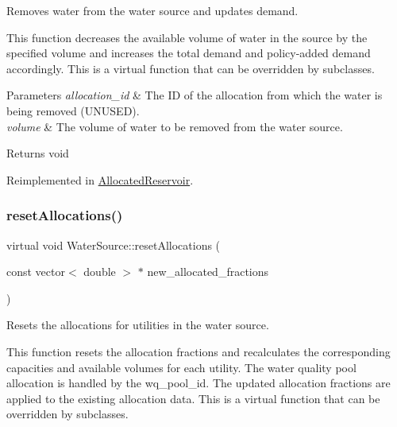 Removes water from the water source and updates demand. 

This function decreases the available volume of water in the source by the specified volume and increases the total demand and policy-\/added demand accordingly. This is a virtual function that can be overridden by subclasses.


\begin{DoxyParams}{Parameters}
{\em allocation\+\_\+id} & The ID of the allocation from which the water is being removed (U\+N\+U\+S\+ED). \\
\hline
{\em volume} & The volume of water to be removed from the water source.\\
\hline
\end{DoxyParams}
\begin{DoxyReturn}{Returns}
void 
\end{DoxyReturn}


Reimplemented in \mbox{\hyperlink{classAllocatedReservoir_a3a9b7ce2e1d42cc373095cfd40ef2ae2}{Allocated\+Reservoir}}.

\mbox{\label{classWaterSource_afe2f6b96383abdb14563db279a261a31}} 
\subsubsection{\texorpdfstring{reset\+Allocations()}{resetAllocations()}}
{\footnotesize\ttfamily virtual void Water\+Source\+::reset\+Allocations (\begin{DoxyParamCaption}\item[{const vector$<$ double $>$ $\ast$}]{new\+\_\+allocated\+\_\+fractions }\end{DoxyParamCaption})\hspace{0.3cm}{\ttfamily [virtual]}}



Resets the allocations for utilities in the water source. 

This function resets the allocation fractions and recalculates the corresponding capacities and available volumes for each utility. The water quality pool allocation is handled by the {\ttfamily wq\+\_\+pool\+\_\+id}. The updated allocation fractions are applied to the existing allocation data. This is a virtual function that can be overridden by subclasses.


